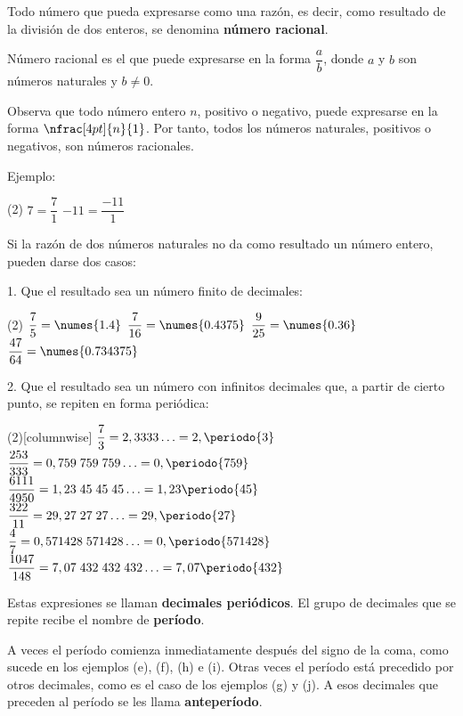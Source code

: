 Todo número que pueda expresarse como una razón, es decir, como resultado 
de la división de dos enteros, se denomina \textbf{número racional}.

\begin{defbox}
Número racional es el que puede expresarse en la forma $\dfrac{a}{b}$,  
donde $a$ y $b$ son números naturales y $b \neq 0$.
\end{defbox}

Observa que todo número entero $n$, positivo o negativo, puede expresarse en 
la forma $\nfrac[4pt]{n}{1}$. Por tanto, todos los números naturales, positivos o 
negativos, son números racionales.
\newpage

Ejemplo: 

\begin{ejemplos2shortbull}(2)
  \task $7 = \dfrac{7}{1}$
  \task $-11 = \dfrac{-11}{1}$
\end{ejemplos2shortbull}


Si la razón de dos números naturales no da como resultado un número entero, 
pueden darse dos casos:

1. Que el resultado sea un número finito de decimales:

\noindent {}

\begin{ejemplos2short}(2)
  \task $\dfrac{7}{5} = \numes{1.4}$
  \task $\dfrac{7}{16} = \numes{0.4375}$
  \task $\dfrac{9}{25} = \numes{0.36}$
  \task $\dfrac{47}{64} = \numes{0.734375}$
\end{ejemplos2short}

2. Que el resultado sea un número con infinitos decimales que, a partir
   de cierto punto, se repiten en forma periódica:

\begin{ejemplos2short}(2)[columnwise]
  \task $\dfrac{7}{3} = 2,3333\ldots = 2,\periodo{3}$
  \task $\dfrac{253}{333} = 0,759\;759\;759\ldots = 0,\periodo{759}$
  \task $\dfrac{6111}{4950} = 1,23\;45\;45\;45\ldots = 1,23\periodo{45}$
  \task $\dfrac{322}{11} = 29,27\;27\;27\ldots = 29,\periodo{27}$
  \task $\dfrac{4}{7} = 0,571428\;571428\ldots = 0,\periodo{571428}$
  \task $\dfrac{1047}{148} = 7,07\;432\;432\;432\ldots = 7,07\periodo{432}$
\end{ejemplos2short}

Estas expresiones se llaman \textbf{decimales periódicos}. 
El grupo de decimales que se repite recibe el nombre de \textbf{período}.  

A veces el período comienza inmediatamente después del signo de la coma, 
como sucede en los ejemplos (e), (f), (h) e (i). Otras veces el período está 
precedido por otros decimales, como es el caso de los ejemplos (g) y (j). 
A esos decimales que preceden al período se les llama  \textbf{anteperíodo}. 

